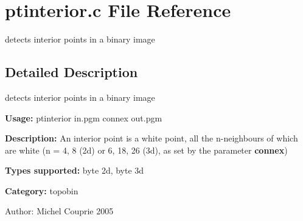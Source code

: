 \section{ptinterior.c File Reference}
\label{ptinterior_8c}
detects interior points in a binary image  




\label{_details}
\subsection{Detailed Description}
detects interior points in a binary image 

{\bf Usage:} ptinterior in.pgm connex out.pgm

{\bf Description:} An interior point is a white point, all the n-neighbours of which are white (n = 4, 8 (2d) or 6, 18, 26 (3d), as set by the parameter {\bf connex})

{\bf Types supported:} byte 2d, byte 3d

{\bf Category:} topobin

\begin{Desc}
\item[Author:]Michel Couprie 2005 \end{Desc}
